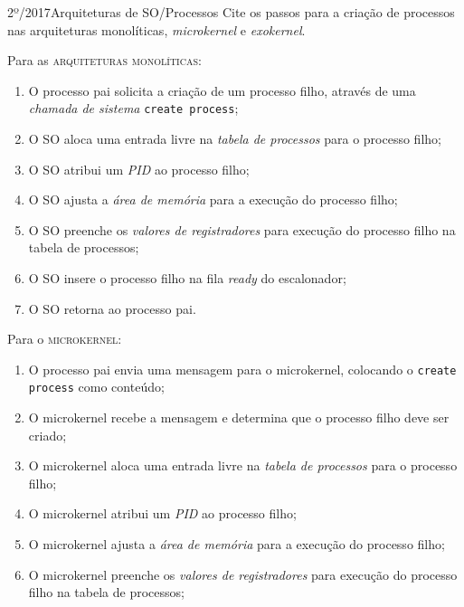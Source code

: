 \begin{exercicio}
  {2º/2017}{Arquiteturas de SO/Processos}
  {Cite os passos para a criação de processos nas arquiteturas monolíticas, \textit{microkernel} e \textit{exokernel}.}
  \label{ex:processes-creation}

  Para as \textsc{arquiteturas monolíticas}:
  \begin{enumerate}
    \item O processo pai solicita a criação de um processo filho, através de uma \textit{chamada de sistema} \texttt{create process};

    \item O SO aloca uma entrada livre na \textit{tabela de processos} para o processo filho;

    \item O SO atribui um \textit{PID} ao processo filho;

    \item O SO ajusta a \textit{área de memória} para a execução do processo filho;

    \item O SO preenche os \textit{valores de registradores} para execução do processo filho na tabela de processos;

    \item O SO insere o processo filho na fila \textit{ready} do escalonador;

    \item O SO retorna ao processo pai.
  \end{enumerate}

  Para o \textsc{microkernel}:
  \begin{enumerate}
    \item O processo pai envia uma mensagem para o microkernel, colocando o \texttt{create process} como conteúdo;

    \item O microkernel recebe a mensagem e determina que o processo filho deve ser criado;

    \item O microkernel aloca uma entrada livre na \textit{tabela de processos} para o processo filho;

    \item O microkernel atribui um \textit{PID} ao processo filho;

    \item O microkernel ajusta a \textit{área de memória} para a execução do processo filho;

    \item O microkernel preenche os \textit{valores de registradores} para execução do processo filho na tabela de processos;


\end{enumerate}
\end{exercicio}

